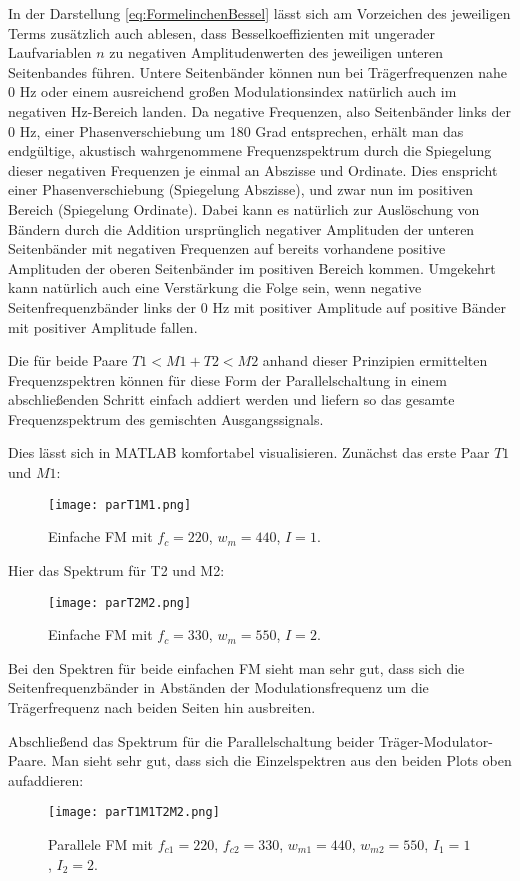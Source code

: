 In der Darstellung \ref{eq:FormelinchenBessel} lässt sich am Vorzeichen des jeweiligen Terms zusätzlich auch ablesen, dass Besselkoeffizienten mit ungerader Laufvariablen $n$ zu negativen Amplitudenwerten des jeweiligen unteren Seitenbandes führen. Untere Seitenbänder können nun bei Trägerfrequenzen nahe 0 Hz oder einem ausreichend großen Modulationsindex natürlich auch im negativen Hz-Bereich landen. Da negative Frequenzen, also Seitenbänder links der 0 Hz, einer Phasenverschiebung um 180 Grad entsprechen, erhält man das endgültige, akustisch wahrgenommene Frequenzspektrum durch die Spiegelung dieser negativen Frequenzen je einmal an Abszisse und Ordinate. Dies enspricht einer Phasenverschiebung (Spiegelung Abszisse), und zwar nun im positiven Bereich (Spiegelung Ordinate). Dabei kann es natürlich zur Auslöschung von Bändern durch die Addition ursprünglich negativer Amplituden der unteren Seitenbänder mit negativen Frequenzen auf bereits vorhandene positive Amplituden der oberen Seitenbänder im positiven Bereich kommen. Umgekehrt kann natürlich auch eine Verstärkung die Folge sein, wenn negative Seitenfrequenzbänder links der 0 Hz mit positiver Amplitude auf positive Bänder mit positiver Amplitude fallen.

Die für beide Paare $T1<M1 + T2<M2$ anhand dieser Prinzipien ermittelten Frequenzspektren können für diese Form der Parallelschaltung in einem abschließenden Schritt einfach addiert werden und liefern so das gesamte Frequenzspektrum des gemischten Ausgangssignals. 

Dies lässt sich in MATLAB komfortabel visualisieren. Zunächst das erste Paar $T1$ und $M1$:
\FloatBarrier
\begin{figure} [ht]
\centering
  \texttt{[image: parT1M1.png]}
\caption{Einfache FM mit $f_c = 220$, $w_m = 440$, $I = 1$. }
\end{figure}
\FloatBarrier
Hier das Spektrum für T2 und M2:
\FloatBarrier
\begin{figure} [ht]
\centering
  \texttt{[image: parT2M2.png]}
\caption{Einfache FM mit $f_c = 330$, $w_m = 550$, $I = 2$. }
\end{figure}
\FloatBarrier
Bei den Spektren für beide einfachen FM sieht man sehr gut, dass sich die Seitenfrequenzbänder in Abständen der Modulationsfrequenz um die Trägerfrequenz nach beiden Seiten hin ausbreiten.

Abschließend das Spektrum für die Parallelschaltung beider Träger-Modulator-Paare. Man sieht sehr gut, dass sich die Einzelspektren aus den beiden Plots oben aufaddieren: 
\FloatBarrier
\begin{figure} [ht]
\centering
  \texttt{[image: parT1M1T2M2.png]}
\caption{Parallele FM mit $f_{c1} = 220$, $f_{c2} = 330$, $w_{m1} = 440$, $w_{m2} = 550$, $I_1 = 1$, $I_2 = 2$. }
\end{figure}
\FloatBarrier

